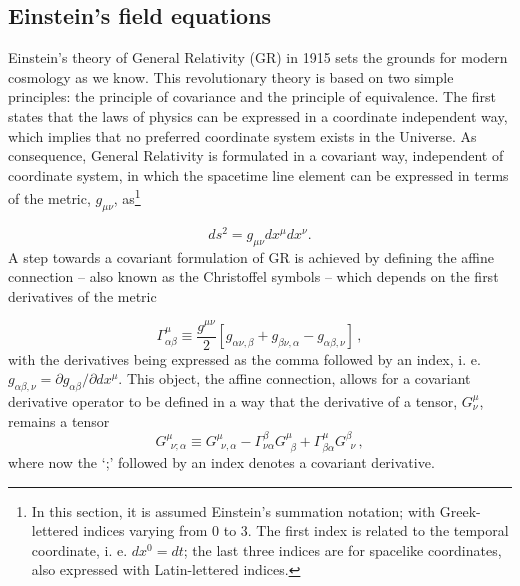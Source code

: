 \subsection{Einstein's field equations}
Einstein's theory of General Relativity (GR) in 1915 sets the grounds for modern cosmology as we know. This revolutionary theory is based on two simple principles: the principle of covariance and the principle of equivalence. The first states that the laws of physics can be expressed in a coordinate independent way, which implies that no preferred coordinate system exists in the Universe. As consequence, General Relativity is formulated in a covariant way, independent of coordinate system, in which the spacetime line element can be expressed in terms of the metric, $g_{\mu\nu}$, as\footnote{ In this section, it is assumed Einstein's summation notation; with Greek-lettered indices varying from 0 to 3. The first index is related to the temporal coordinate, i. e. $dx^0 = dt$; the last three indices are for spacelike coordinates, also expressed with Latin-lettered indices.}

\begin{equation}
ds^2 = g_{\mu\nu}dx^{\mu}dx^{\nu}.
\label{Eq:Intro:LineElement}
\end{equation}
A step towards a covariant formulation of GR is achieved by defining the affine connection -- also known as the Christoffel symbols -- which depends on the first derivatives of the metric

\begin{equation}
\Gamma_{\alpha\beta}^{\mu} \equiv \frac{g^{\mu\nu}}{2} \left[ g_{\alpha\nu, \beta} + g_{\beta\nu, \alpha} - g_{\alpha\beta,\nu}\right]\, ,
\label{Eq:Intro:ChrisSymb}
\end{equation}
with the derivatives being expressed as the comma followed by an index, i. e. $g_{\alpha\beta, \nu} = \partial g_{\alpha\beta}/ \partial dx^{\mu}$. This object, the affine connection, allows for a covariant derivative operator to be defined in a way that the derivative of a tensor, $G^{\mu}_{\nu}$, remains a tensor
\begin{equation}
G^{\mu}_{\ \ \nu; \alpha} \equiv G^{\mu}_{\ \ \nu, \alpha} - \Gamma_{\nu\alpha}^{\beta}G^{\mu}_{\ \ \beta} + \Gamma_{\beta\alpha}^{\mu} G^{\beta}_{\ \ \nu}\, ,
\end{equation}
where now the `;' followed by an index denotes a covariant derivative.

